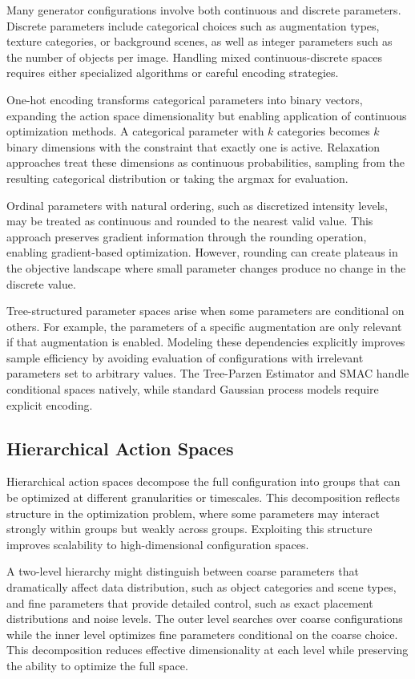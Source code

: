 Many generator configurations involve both continuous and discrete parameters. Discrete parameters include categorical choices such as augmentation types, texture categories, or background scenes, as well as integer parameters such as the number of objects per image. Handling mixed continuous-discrete spaces requires either specialized algorithms or careful encoding strategies.

One-hot encoding transforms categorical parameters into binary vectors, expanding the action space dimensionality but enabling application of continuous optimization methods. A categorical parameter with $k$ categories becomes $k$ binary dimensions with the constraint that exactly one is active. Relaxation approaches treat these dimensions as continuous probabilities, sampling from the resulting categorical distribution or taking the argmax for evaluation.

Ordinal parameters with natural ordering, such as discretized intensity levels, may be treated as continuous and rounded to the nearest valid value. This approach preserves gradient information through the rounding operation, enabling gradient-based optimization. However, rounding can create plateaus in the objective landscape where small parameter changes produce no change in the discrete value.

Tree-structured parameter spaces arise when some parameters are conditional on others. For example, the parameters of a specific augmentation are only relevant if that augmentation is enabled. Modeling these dependencies explicitly improves sample efficiency by avoiding evaluation of configurations with irrelevant parameters set to arbitrary values. The Tree-Parzen Estimator and SMAC handle conditional spaces natively, while standard Gaussian process models require explicit encoding.

\subsection{Hierarchical Action Spaces}
\label{subsec:hierarchical_actions}

Hierarchical action spaces decompose the full configuration into groups that can be optimized at different granularities or timescales. This decomposition reflects structure in the optimization problem, where some parameters may interact strongly within groups but weakly across groups. Exploiting this structure improves scalability to high-dimensional configuration spaces.

A two-level hierarchy might distinguish between coarse parameters that dramatically affect data distribution, such as object categories and scene types, and fine parameters that provide detailed control, such as exact placement distributions and noise levels. The outer level searches over coarse configurations while the inner level optimizes fine parameters conditional on the coarse choice. This decomposition reduces effective dimensionality at each level while preserving the ability to optimize the full space.

